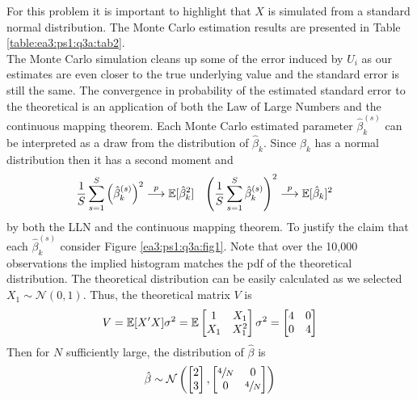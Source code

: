 \documentclass{article}
\begin{document}
\begin{solution}
For this problem it is important to highlight that $X$ is simulated from a standard normal distribution. The Monte Carlo estimation results are presented in Table \ref{table:ea3:ps1:q3a:tab2}. 
 \\ 
The Monte Carlo simulation cleans up some of the error induced by $U_i$ as our estimates are even closer to the true underlying value and the standard error is still the same. The convergence in probability of the estimated standard error to the theoretical is an application of both the Law of Large Numbers and the continuous mapping theorem. Each Monte Carlo estimated parameter $\hat{\beta}_k^{(s)}$ can be interpreted as a draw from the distribution of $\hat{\beta}_k$. Since $\hat{\beta}_k$ has a normal distribution then it has a second moment and 
\begin{align*}
    \frac{1}{S} \sum_{s=1}^{S}\left(\hat{\beta}_{k}^{(s)}\right)^{2}&\stackrel{p}{\longrightarrow}  \mathbb{E}[\hat{\beta}_k^2] & 
    \left(\frac{1}{S} \sum_{s=1}^{S} \hat{\beta}_{k}^{(s)}\right)^{2}&\stackrel{p}{\longrightarrow} \mathbb{E}[\hat{\beta}_k]^2
\end{align*}
by both the LLN and the continuous mapping theorem. To justify the claim that each $\hat{\beta}_k^{(s)}$ consider Figure \ref{ea3:ps1:q3a:fig1}. Note that over the 10,000 observations the implied histogram matches the pdf of the theoretical distribution. The theoretical distribution can be easily calculated as we selected $X_1\sim\mathcal{N}(0,1)$. Thus, the theoretical matrix $V$ is 
\begin{equation*}
    V = \mathbb{E}[X'X]\sigma^2 = \mathbb{E}\begin{bmatrix}
    1 & X_1 \\ X_1 & X_1^2
    \end{bmatrix}\sigma^2 = 
    \begin{bmatrix}
    4 & 0 \\ 0 & 4
    \end{bmatrix} 
\end{equation*}
Then for $N$ sufficiently large, the distribution of $\hat{\beta}$ is 
\begin{equation*}
    \hat{\beta}\sim\mathcal{N}\left(\begin{bmatrix}
    2 \\ 3
    \end{bmatrix},\begin{bmatrix}
    \sfrac{4}{N} & 0 \\ 0 & \sfrac{4}{N}
    \end{bmatrix}\right)

\end{equation*}
\end{solution}
\end{document}

